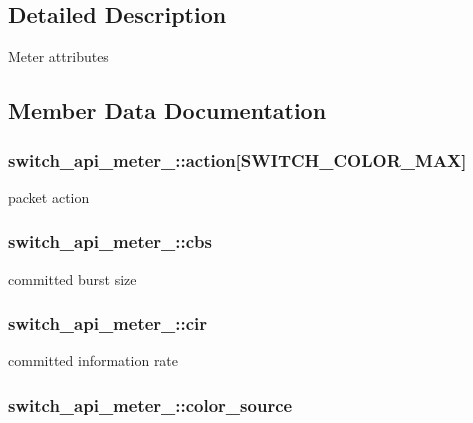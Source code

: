 \subsection{Detailed Description}
Meter attributes 

\subsection{Member Data Documentation}
\hypertarget{structswitch__api__meter___a638ba8d1ef1924c93d7e1ce1e8b058cb}{
\subsubsection[{action}]{ switch\+\_\+api\+\_\+meter\+\_\+\+::action\mbox{[}S\+W\+I\+T\+C\+H\+\_\+\+C\+O\+L\+O\+R\+\_\+\+M\+A\+X\mbox{]}}}\label{structswitch__api__meter___a638ba8d1ef1924c93d7e1ce1e8b058cb}
packet action \hypertarget{structswitch__api__meter___a864fa5ab0317ac119f0e967c9f289cd7}{
\subsubsection[{cbs}]{ switch\+\_\+api\+\_\+meter\+\_\+\+::cbs}}\label{structswitch__api__meter___a864fa5ab0317ac119f0e967c9f289cd7}
committed burst size \hypertarget{structswitch__api__meter___ac43cc00423459a18d768f3c39540a415}{
\subsubsection[{cir}]{ switch\+\_\+api\+\_\+meter\+\_\+\+::cir}}\label{structswitch__api__meter___ac43cc00423459a18d768f3c39540a415}
committed information rate \hypertarget{structswitch__api__meter___afe1e9c1c8e262479e69438bd9c6a48a8}{
\subsubsection[{color\+\_\+source}]{ switch\+\_\+api\+\_\+meter\+\_\+\+::color\+\_\+source}}\label{structswitch__api__meter___afe1e9c1c8e262479e69438bd9c6a48a8}
